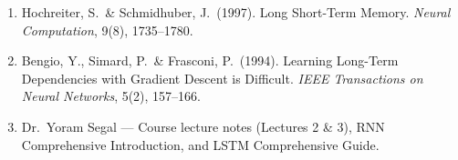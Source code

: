 \documentclass[12pt, a4paper]{article}
\begin{document}
\begin{enumerate}
    \item Hochreiter, S.\ \& Schmidhuber, J.\ (1997).
          Long Short-Term Memory.
          \textit{Neural Computation}, 9(8), 1735--1780.

    \item Bengio, Y., Simard, P.\ \& Frasconi, P.\ (1994).
          Learning Long-Term Dependencies with Gradient Descent is
          Difficult.
          \textit{IEEE Transactions on Neural Networks}, 5(2), 157--166.

    \item Dr.\ Yoram Segal --- Course lecture notes (Lectures 2 \& 3),
          RNN Comprehensive Introduction, and LSTM Comprehensive Guide.
\end{enumerate}
\end{document}
